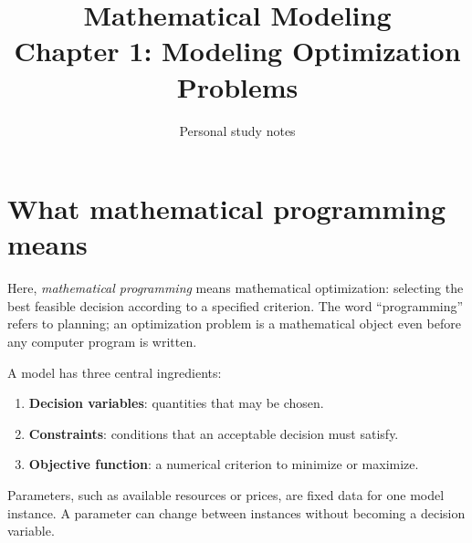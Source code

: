 \documentclass[11pt,a4paper]{article}
\title{\textbf{Mathematical Modeling}\\[2mm]
\large Chapter 1: Modeling Optimization Problems}
\author{Personal study notes}
\date{}
\begin{document}
\maketitle
\lecturelegend
\tableofcontents

\section{What mathematical programming means}\label{sec:meaning}
Here, \emph{mathematical programming} means mathematical optimization: selecting
the best feasible decision according to a specified criterion. The word
``programming'' refers to planning; an optimization problem is a mathematical
object even before any computer program is written.

\begin{lecturecore}
  A model has three central ingredients:
  \begin{enumerate}[leftmargin=1.8em]
    \item \textbf{Decision variables}: quantities that may be chosen.
    \item \textbf{Constraints}: conditions that an acceptable decision must satisfy.
    \item \textbf{Objective function}: a numerical criterion to minimize or maximize.
  \end{enumerate}
\end{lecturecore}
Parameters, such as available resources or prices, are fixed data for one model
instance. A parameter can change between instances without becoming a decision
variable.
\end{document}
